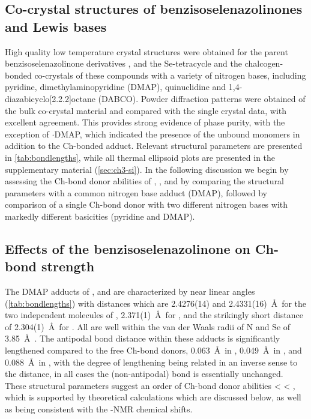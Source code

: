 \begin{refsection}
    \subsection{Co-crystal structures of benzisoselenazolinones and Lewis bases}
    High quality low temperature crystal structures were obtained for the parent benzisoselenazolinone derivatives  \autocite{Thomas2015},  and the Se-tetracycle  and the chalcogen-bonded co-crystals of these compounds with a variety of nitrogen bases, including pyridine, dimethylaminopyridine (DMAP), quinuclidine and 1,4-diaza\-bicyclo[2.2.2]\-oct\-ane (DABCO).
    Powder diffraction patterns were obtained of the bulk co-crystal material and compared with the single crystal data, with excellent agreement.
    This provides strong evidence of phase purity, with the exception of $ \cdot $DMAP, which indicated the presence of the unbound monomers in addition to the Ch-bonded adduct.
    Relevant structural parameters are presented in \cref{tab:bondlengths}, while all thermal ellipsoid plots are presented in the supplementary material (\cref{sec:ch3-si}).
    In the following discussion we begin by assessing the Ch-bond donor abilities of , , and  by comparing the structural parameters with a common nitrogen base adduct (DMAP), followed by comparison of a single Ch-bond donor  with two different nitrogen bases with markedly different basicities (pyridine and DMAP).
    
    \subsection{Effects of the benzisoselenazolinone on Ch-bond strength}
    The DMAP adducts of ,  and  are characterized by near linear  angles (\cref{tab:bondlengths}) with  distances which are 2.4276(14) and 2.4331(16)~\AA\ for the two independent molecules of , 2.371(1)~\AA\ for , and the strikingly short  distance of 2.304(1)~\AA\ for .
    All are well within the van der Waals radii of N and Se of 3.85~\AA\ \autocite{Batsanov2001}.
    The antipodal  bond distance within these adducts is significantly lengthened compared to the free Ch-bond donors, 0.063~\AA\ in , 0.049~\AA\ in , and 0.088~\AA\ in , with the degree of lengthening being related in an inverse sense to the  distance, in all cases the (non-antipodal)  bond is essentially unchanged.
    These structural parameters suggest an order of Ch-bond donor abilities  <  < , which is supported by theoretical calculations which are discussed below, as well as being consistent with the -NMR chemical shifts.
    

\end{refsection}

